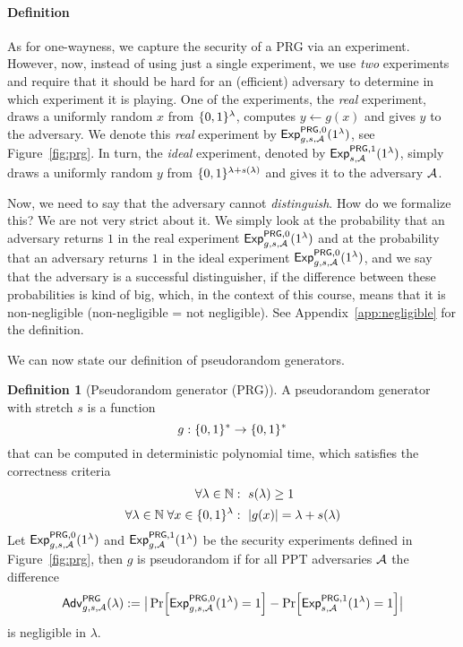 \documentclass[a4paper,table,dvipsnames]{article}
\theoremstyle{definition}
\newtheorem{definition}{Definition}[section]
\begin{document}
\paragraph{Definition}
As for one-wayness, we capture the security of a PRG via an experiment. However, now, instead of using just a single experiment, we use \emph{two} experiments and require that it should be hard for an (efficient) adversary to determine in which experiment it is playing. One of the experiments, the \emph{real} experiment, draws a uniformly random $x$ from $\{0,1\}^\lambda$, computes $y\gets g(x)$ and gives $y$ to the adversary. We denote this \emph{real} experiment by ${\mathsf{Exp}}_{g,s,\mathcal{A}}^{\mathsf{PRG},0}(1^\lambda)$, see Figure~\ref{fig:prg}. In turn, the \emph{ideal} experiment, denoted by ${\mathsf{Exp}}_{s,\mathcal{A}}^{\mathsf{PRG},1}(1^\lambda)$, simply draws a uniformly random $y$ from $\{0,1\}^{\lambda+s(\lambda)}$ and gives it to the adversary $\mathcal{A}$.

Now, we need to say that the adversary cannot \emph{distinguish}. How do we formalize this? We are not very strict about it. We simply look at the probability that an adversary returns $1$ in the real experiment ${\mathsf{Exp}}_{g,s,\mathcal{A}}^{\mathsf{PRG},0}(1^\lambda)$ and at the probability that an adversary returns $1$ in the ideal experiment ${\mathsf{Exp}}_{g,s,\mathcal{A}}^{\mathsf{PRG},0}(1^\lambda)$, and we say that the adversary is a successful distinguisher, if the difference between these probabilities is kind of big, which, in the context of this course, means that it is non-negligible (non-negligible = not negligible). See Appendix~\ref{app:negligible} for the definition.

We can now state our definition of pseudorandom generators.


\begin{definition}[Pseudorandom generator (PRG)]
A pseudorandom generator with stretch $s$ is a function
  \[g:\{0,1\}^*\rightarrow\{0,1\}^*\] 
that can be computed in deterministic polynomial time, which satisfies the correctness criteria
\begin{align*}
\forall \lambda\in\NN&:\ s(\lambda)\geq 1 \\
\forall \lambda\in\NN\; \forall x\in\bin^\lambda&:\ \abs{g(x)}=\lambda+s(\lambda) \\
\end{align*}
Let ${\mathsf{Exp}}_{g,s,\mathcal{A}}^{\mathsf{PRG},0}(1^\lambda)$ and ${\mathsf{Exp}}_{g,\mathcal{A}}^{\mathsf{PRG},1}(1^\lambda)$ be the security experiments defined in Figure~\ref{fig:prg}, then $g$ is pseudorandom if for all PPT adversaries $\mathcal{A}$ the difference
\[ \mathsf{Adv}^{\mathsf{PRG}}_{g,s,\adv}(\lambda):=\big|\prob{{\mathsf{Exp}}_{g,s,\adv}^{\mathsf{PRG},0}(1^\lambda) = 1} 
   - \prob{{\mathsf{Exp}}_{s,\adv}^{\mathsf{PRG},1}(1^\lambda) = 1}\big| \]
is negligible in $\lambda$.
\end{definition}
\end{document}
